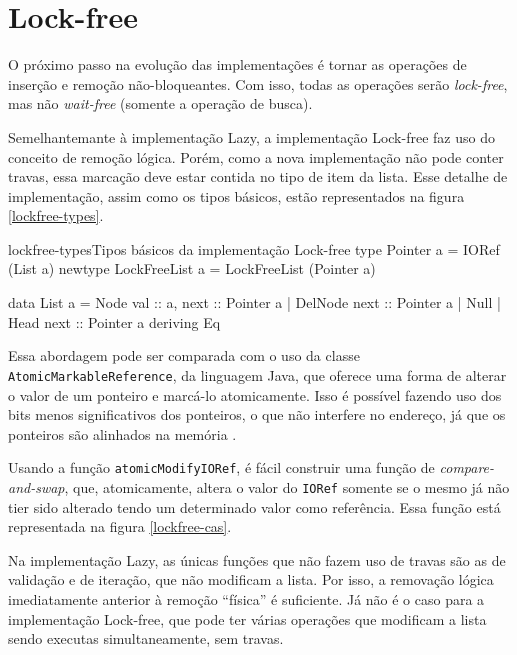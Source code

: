 \documentclass[a4paper,12pt,oldfontcommands]{abntex2}
\begin{document}
\section{Lock-free}

O próximo passo na evolução das implementações é tornar as operações de inserção e remoção não-bloqueantes. Com isso, todas as operações serão \textit{lock-free}, mas não \textit{wait-free} (somente a operação de busca).

Semelhantemante à implementação Lazy, a implementação Lock-free faz uso do conceito de remoção lógica. Porém, como a nova implementação não pode conter travas, essa marcação deve estar contida no tipo de item da lista. Esse detalhe de implementação, assim como os tipos básicos, estão representados na figura \ref{lockfree-types}.

\begin{code}{lockfree-types}{Tipos básicos da implementação Lock-free}
type Pointer a = IORef (List a)
newtype LockFreeList a = LockFreeList (Pointer a)

data List a = Node { val :: a, next :: Pointer a }
    | DelNode { next :: Pointer a }
    | Null
    | Head { next :: Pointer a }
    deriving Eq
\end{code}

Essa abordagem pode ser comparada com o uso da classe \texttt{AtomicMarkableReference}, da linguagem Java, que oferece uma forma de alterar o valor de um ponteiro e marcá-lo atomicamente. Isso é possível fazendo uso dos bits menos significativos dos ponteiros, o que não interfere no endereço, já que os ponteiros são alinhados na memória \cite{herlihy2011art}.

Usando a função \texttt{atomicModifyIORef}, é fácil construir uma função de \textit{compare-and-swap}, que, atomicamente, altera o valor do \texttt{IORef} somente se o mesmo já não tier sido alterado tendo um determinado valor como referência. Essa função está representada na figura \ref{lockfree-cas}.


Na implementação Lazy, as únicas funções que não fazem uso de travas são as de validação e de iteração, que não modificam a lista. Por isso, a removação lógica imediatamente anterior à remoção ``física'' é suficiente. Já não é o caso para a implementação Lock-free, que pode ter várias operações que modificam a lista sendo executas simultaneamente, sem travas.
\end{document}
